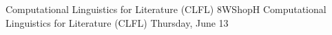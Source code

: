 \begin{wsschedule}
{Computational Linguistics for Literature (CLFL)}
{8}{WShopH}
{Computational Linguistics for Literature (CLFL)}
{Thursday, June 13}{\WShopLocH}

\end{wsschedule}
